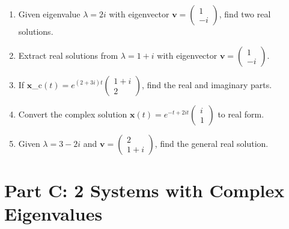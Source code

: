 \documentclass[12pt]{article}
\begin{document}
\begin{enumerate}[start=6]
\item Given eigenvalue $\lambda = 2i$ with eigenvector $\mathbf{v} = \begin{pmatrix} 1 \\ -i \end{pmatrix}$, find two real solutions.

\item Extract real solutions from $\lambda = 1 + i$ with eigenvector $\mathbf{v} = \begin{pmatrix} 1 \\ -i \end{pmatrix}$.

\item If $\mathbf{x}$_{c}$(t) = e^{(2+3i)t}\begin{pmatrix} 1+i \\ 2 \end{pmatrix}$, find the real and imaginary parts.

\item Convert the complex solution $\mathbf{x}(t) = e^{-t+2it}\begin{pmatrix} i \\ 1 \end{pmatrix}$ to real form.

\item Given $\lambda = 3 - 2i$ and $\mathbf{v} = \begin{pmatrix} 2 \\ 1+i \end{pmatrix}$, find the general real solution.
\end{enumerate}

\section*{Part C: 2 Systems with Complex Eigenvalues}
\end{document}
